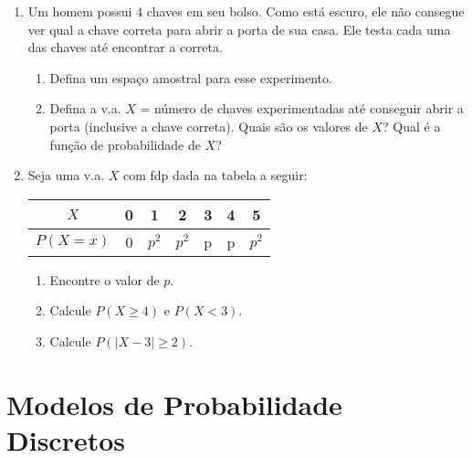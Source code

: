 \begin{enumerate}
\item Um homem possui $4$ chaves em seu bolso. Como está escuro, ele não consegue ver qual a
chave correta para abrir a porta de sua casa. Ele testa cada uma das chaves até encontrar a
correta.

	\begin{enumerate}[label=\alph*)]
		\item Defina um espaço amostral para esse experimento.
		\item Defina a v.a. $X$ = número de chaves experimentadas até conseguir abrir a porta (inclusive a chave correta). 
		Quais são os valores de $X$? Qual é a função de probabilidade de $X$?
	\end{enumerate}
	
\item Seja uma v.a. $X$ com fdp dada na tabela a seguir:

    \begin{table}[htpb]
        \centering
        \begin{tabular}{|c|c|c|c|c|c|c|}
            \hline
            $X$      & 0 & 1       & 2       & 3 & 4 & 5 \\ \hline
            $P(X=x)$ & 0 & $p^{2}$ & $p^{2}$ & p & p & $p^{2}$ \\ \hline
        \end{tabular}
    \end{table}
    
    	\begin{enumerate}[label=\alph*)]
		\item Encontre o valor de $p$.
		\item Calcule $P (X \geq 4)$ e $P (X < 3)$.
		\item Calcule $P (|X − 3| \geq 2)$.
	\end{enumerate}
	\solv{}

\end{enumerate}

\newpage
\section*{Modelos de Probabilidade Discretos}

